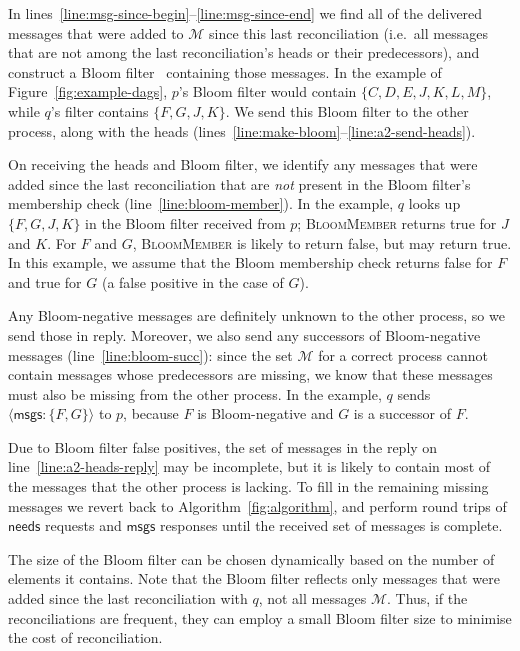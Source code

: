 \documentclass[a4paper,anonymous,USenglish]{lipics-v2019}
\begin{document}
In lines~\ref{line:msg-since-begin}--\ref{line:msg-since-end} we find all of the delivered messages that were added to $\mathcal{M}$ since this last reconciliation (i.e.\ all messages that are not among the last reconciliation's heads or their predecessors), and construct a Bloom filter~\cite{Bloom:1970} containing those messages.
In the example of Figure~\ref{fig:example-dags}, $p$'s Bloom filter would contain $\{C, D, E, J, K, L, M\}$, while $q$'s filter contains $\{F, G, J, K\}$.
We send this Bloom filter to the other process, along with the heads (lines~\ref{line:make-bloom}--\ref{line:a2-send-heads}).

On receiving the heads and Bloom filter, we identify any messages that were added since the last reconciliation that are \emph{not} present in the Bloom filter's membership check (line~\ref{line:bloom-member}).
In the example, $q$ looks up $\{F, G, J, K\}$ in the Bloom filter received from $p$; \textsc{BloomMember} returns true for $J$ and $K$. For $F$ and $G$, \textsc{BloomMember} is likely to return false, but may return true.
In this example, we assume that the Bloom membership check returns false for $F$ and true for $G$ (a false positive in the case of $G$).

Any Bloom-negative messages are definitely unknown to the other process, so we send those in reply.
Moreover, we also send any successors of Bloom-negative messages (line~\ref{line:bloom-succ}): since the set $\mathcal{M}$ for a correct process cannot contain messages whose predecessors are missing, we know that these messages must also be missing from the other process.
In the example, $q$ sends $\langle\mathsf{msgs}: \{F, G\}\rangle$ to $p$, because $F$ is Bloom-negative and $G$ is a successor of $F$.

Due to Bloom filter false positives, the set of messages in the reply on line~\ref{line:a2-heads-reply} may be incomplete, but it is likely to contain most of the messages that the other process is lacking.
To fill in the remaining missing messages we revert back to Algorithm~\ref{fig:algorithm}, and perform round trips of $\mathsf{needs}$ requests and $\mathsf{msgs}$ responses until the received set of messages is complete.

The size of the Bloom filter can be chosen dynamically based on the number of elements it contains.
Note that the Bloom filter reflects only messages that were added since the last reconciliation with $q$, not all messages $\mathcal{M}$.
Thus, if the reconciliations are frequent, they can employ a small Bloom filter size to minimise the cost of reconciliation.
\end{document}
